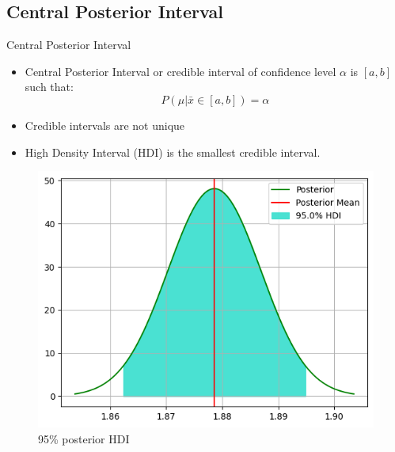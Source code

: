 \subsection{Central Posterior Interval}

\begin{frame}{Central Posterior Interval}

  \begin{itemize}
    \item Central Posterior Interval or credible interval of confidence level $\alpha$ is $[a, b]$ such that:
    \[ P(\mu | \bar{x} \in [a, b]) = \alpha \]
    \item Credible intervals are not unique
    \item High Density Interval (HDI) is the smallest credible interval.
  \end{itemize}

  \begin{figure}
    \centering
    \includegraphics[width=.6\textwidth]{../Report/images/hdi.png}
    \caption{95\% posterior HDI}
  \end{figure}
  
\end{frame}
